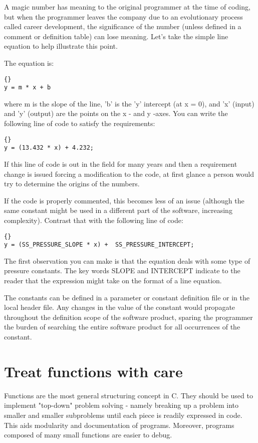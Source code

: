 \documentclass{report}
\begin{document}
A magic number has meaning to the original programmer at the time of coding, but when the programmer leaves the company due to an evolutionary process called career development, the significance of the number (unless defined in a comment or definition table) can lose meaning. Let's take the simple line equation to help illustrate this point.

The equation is: 
\begin{lstlisting}{}
y = m * x + b
\end{lstlisting}
where m is the slope of the line, 'b' is the 'y' intercept (at x = 0), and 'x' (input) and 'y' (output) are the points on the x - and y -axes. You can write the following line of code to satisfy the requirements: 
\begin{lstlisting}{}
y = (13.432 * x) + 4.232;
\end{lstlisting}
If this line of code is out in the field for many years and then a requirement change is issued forcing a modification to the code, at first glance a person would try to determine the origins of the numbers.

If the code is properly commented, this becomes less of an issue (although the same constant might be used in a different part of the software, increasing complexity). Contrast that with the following line of code: 
\begin{lstlisting}{}
y = (SS_PRESSURE_SLOPE * x) +  SS_PRESSURE_INTERCEPT;
\end{lstlisting}
The first observation you can make is that the equation deals with some type of pressure constants. The key words SLOPE and INTERCEPT indicate to the reader that the expression might take on the format of a line equation.

The constants can be defined in a parameter or constant definition file or in the local header file. Any changes in the value of the constant would propagate throughout the definition scope of the software product, sparing the programmer the burden of searching the entire software product for all occurrences of the constant. 


\section{Treat functions with care}
Functions are the most general structuring concept in C. They should be used to implement "top-down" problem solving - namely breaking up a problem into smaller and smaller subproblems until each piece is readily expressed in code. This aids modularity and documentation of programs. Moreover, programs composed of many small functions are easier to debug.
\end{document}

